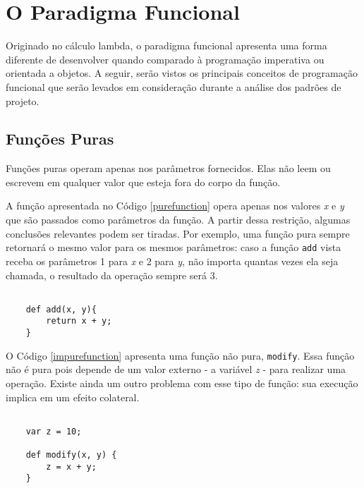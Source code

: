 \chapter{O Paradigma Funcional}

Originado no cálculo lambda, o paradigma funcional 
apresenta uma forma diferente de desenvolver quando 
comparado à programação imperativa ou orientada a 
objetos. A seguir, serão vistos os principais 
conceitos de programação funcional que serão 
levados em consideração durante a análise dos 
padrões de projeto.

\section{Funções Puras}

Funções puras operam apenas nos parâmetros fornecidos. 
Elas não leem ou escrevem em qualquer valor que esteja 
fora do corpo da função\cite{purefunctionscala, functionalscala}.

A função apresentada no Código \ref{purefunction} 
opera apenas nos valores \textit{x} e \textit{y} que 
são passados como parâmetros da função. A partir 
dessa restrição, algumas conclusões relevantes podem 
ser tiradas. Por exemplo, uma função pura sempre 
retornará o mesmo valor para os mesmos parâmetros: 
caso a função \texttt{add} vista receba os parâmetros 1 para 
\textit{x} e 2 para \textit{y}, não importa quantas vezes 
ela seja chamada, 
o resultado da operação sempre será 3\cite{functionalscala}.

\begin{lstlisting}[caption={Exemplo de Função Pura. Fonte: O Autor (2021)},label=purefunction]

    def add(x, y){
        return x + y;
    }

\end{lstlisting}

O Código \ref{impurefunction} apresenta uma função 
não pura, \texttt{modify}. Essa função não é pura pois 
depende de um valor externo - a variável \textit{z} - para 
realizar uma operação. Existe ainda um outro problema 
com esse tipo de função: sua execução implica em 
um efeito colateral.

\begin{lstlisting}[caption={Exemplo de Função Impura. Fonte: O Autor (2021)},label=impurefunction]

    var z = 10;

    def modify(x, y) {
        z = x + y;
    }

\end{lstlisting}

